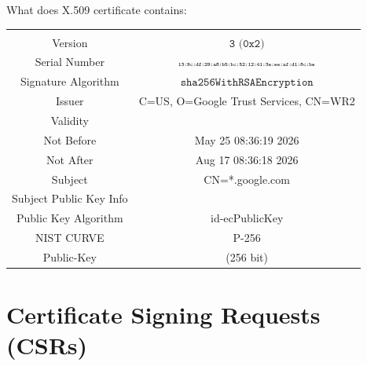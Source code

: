 \documentclass[a4paper, 12pt]{book} %
\begin{document}
What does X.509 certificate contains:
\begin{table}[H]
    \begin{tabular}{|c|c|} \hline \\
        Version & $\texttt{3 (0x2)}$\\ \hline 
        Serial Number & $\texttt{\tiny 13:9c:df:29:a8:b5:bc:52:12:41:3e:ee:af:d1:8c:be}$ \\ \hline 
        Signature Algorithm & $\texttt{sha256WithRSAEncryption}$ \\ \hline 
        Issuer &  C=US, O=Google Trust Services, CN=WR2 \\
        Validity & \\
        Not Before & May 25 08:36:19 2026 \\
        Not After & Aug 17 08:36:18 2026 \\
        Subject & CN=*.google.com \\
        Subject Public Key Info &  \\
        Public Key Algorithm &  id-ecPublicKey \\
        NIST CURVE &  P-256 \\
        Public-Key & (256 bit) \\
    \end{tabular}
\end{table}

\section{Certificate Signing Requests (CSRs)}














\cite{adamson2012set}







\printindex
\end{document}
